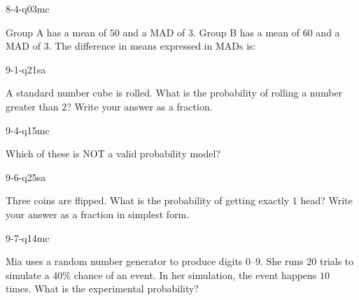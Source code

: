\begin{practiceQuestion}{8-4-q03}{mc}
\begin{questionText}
Group A has a mean of $50$ and a MAD of $3$. Group B has a mean of $60$ and a MAD of $3$. The difference in means expressed in MADs is:
\end{questionText}
\end{practiceQuestion}

\begin{practiceQuestion}{9-1-q21}{sa}
\begin{questionText}
A standard number cube is rolled. What is the probability of rolling a number greater than $2$? Write your answer as a fraction.
\end{questionText}
\end{practiceQuestion}

\begin{practiceQuestion}{9-4-q15}{mc}
\begin{questionText}
Which of these is NOT a valid probability model?
\end{questionText}
\end{practiceQuestion}

\begin{practiceQuestion}{9-6-q25}{sa}
\begin{questionText}
Three coins are flipped. What is the probability of getting exactly $1$ head? Write your answer as a fraction in simplest form.
\end{questionText}
\end{practiceQuestion}

\begin{practiceQuestion}{9-7-q14}{mc}
\begin{questionText}
Mia uses a random number generator to produce digits $0$--$9$. She runs $20$ trials to simulate a $40\%$ chance of an event. In her simulation, the event happens $10$ times. What is the experimental probability?
\end{questionText}
\end{practiceQuestion}
